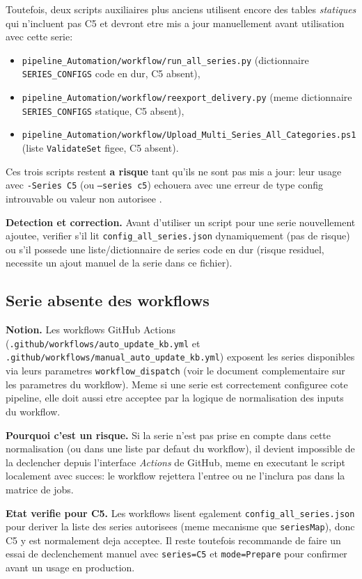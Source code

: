 \documentclass[11pt,a4paper]{article}
\begin{document}
Toutefois, deux scripts auxiliaires plus anciens utilisent encore des tables
\emph{statiques} qui n'incluent pas C5 et devront etre mis a jour manuellement
avant utilisation avec cette serie:
\begin{itemize}[leftmargin=*]
  \item \texttt{pipeline\_Automation/workflow/run\_all\_series.py} (dictionnaire
  \texttt{SERIES\_CONFIGS} code en dur, C5 absent),
  \item \texttt{pipeline\_Automation/workflow/reexport\_delivery.py} (meme
  dictionnaire \texttt{SERIES\_CONFIGS} statique, C5 absent),
  \item \texttt{pipeline\_Automation/workflow/Upload\_Multi\_Series\_All\_Categories.ps1}
  (liste \texttt{ValidateSet} figee, C5 absent).
\end{itemize}
Ces trois scripts restent \textbf{a risque} tant qu'ils ne sont pas mis a jour:
leur usage avec \texttt{-Series C5} (ou \texttt{--series c5}) echouera avec une
erreur de type \og config introuvable \fg{} ou \og valeur non autorisee \fg{}.

\textbf{Detection et correction.} Avant d'utiliser un script pour une serie
nouvellement ajoutee, verifier s'il lit \texttt{config\_all\_series.json}
dynamiquement (pas de risque) ou s'il possede une liste/dictionnaire de series
code en dur (risque residuel, necessite un ajout manuel de la serie dans ce
fichier).

\subsection{Serie absente des workflows}
\textbf{Notion.} Les workflows GitHub Actions
(\texttt{.github/workflows/auto\_update\_kb.yml} et
\texttt{.github/workflows/manual\_auto\_update\_kb.yml}) exposent les series
disponibles via leurs parametres \texttt{workflow\_dispatch} (voir le document
complementaire sur les parametres du workflow). Meme si une serie est
correctement configuree cote pipeline, elle doit aussi etre acceptee par la
logique de normalisation des inputs du workflow.

\textbf{Pourquoi c'est un risque.} Si la serie n'est pas prise en compte dans
cette normalisation (ou dans une liste par defaut du workflow), il devient
impossible de la declencher depuis l'interface \emph{Actions} de GitHub, meme en
executant le script localement avec succes: le workflow rejettera l'entree ou
ne l'inclura pas dans la matrice de jobs.

\textbf{Etat verifie pour C5.} Les workflows lisent egalement
\texttt{config\_all\_series.json} pour deriver la liste des series autorisees
(meme mecanisme que \texttt{seriesMap}), donc C5 y est normalement deja
acceptee. Il reste toutefois recommande de faire un essai de declenchement
manuel avec \texttt{series=C5} et \texttt{mode=Prepare} pour confirmer avant un
usage en production.
\end{document}
